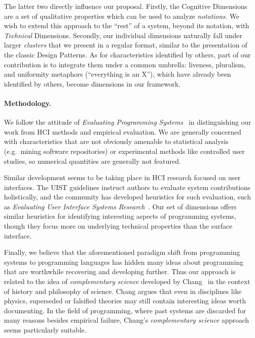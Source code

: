 \documentclass[english,submission]{programming}
\providecommand{\DIFadd}[1]{{\protect\color{blue}\uwave{#1}}} %
\providecommand{\DIFaddbegin}{} %
\providecommand{\DIFaddend}{} %
\begin{document}
The latter two directly influence our proposal. Firstly, the Cognitive
Dimensions are a set of qualitative properties which can be used to
analyze \emph{notations}. We wish to extend this approach to the
``rest'' of a system, beyond its notation, with \emph{Technical}
Dimensions. Secondly, our individual dimensions naturally fall under
larger \emph{clusters} that we present in a regular format, similar to
the presentation of the classic Design Patterns. As for characteristics
identified by others, part of our contribution is to integrate them
under a common umbrella: liveness, pluralism, and uniformity metaphors
(``everything is an X''), which have already been identified by others,
become dimensions in our framework.

\paragraph{Methodology.}

We follow the attitude of \emph{Evaluating Programming
Systems}~\cite{EvProgSys} in distinguishing our work from HCI methods
and empirical evaluation. We are generally concerned with
characteristics that are not obviously amenable to statistical analysis
(e.g.~mining software repositories) or experimental methods like
controlled user studies, so numerical quantities are generally not
featured.

Similar development seems to be taking place in HCI research focused on
user interfaces. The UIST guidelines\DIFaddbegin \DIFadd{~}\DIFaddend \cite{UISTAuthor} instruct authors
to evaluate system contributions holistically, and the community has
developed heuristics for such evaluation, such as \emph{Evaluating User
Interface Systems Research}~\cite{EvUISR}. Our set of dimensions offers
similar heuristics for identifying interesting aspects of programming
systems, though they focus more on underlying technical properties than
the surface interface.

Finally, we believe that the aforementioned paradigm shift from
programming systems to programming languages has hidden many ideas about
programming that are worthwhile recovering and developing
further\DIFaddbegin \DIFadd{~}\DIFaddend \cite{ComplementaryBasic}. Thus our approach is related to the
idea of \emph{complementary science} developed by Chang~\cite{Chang} in
the context of history and philosophy of science. Chang argues that even
in disciplines like physics, superseded or falsified theories may still
contain interesting ideas worth documenting. In the field of
programming, where past systems are discarded for many reasons besides
empirical failure, Chang's \emph{complementary science} approach seems
particularly suitable.
\end{document}
